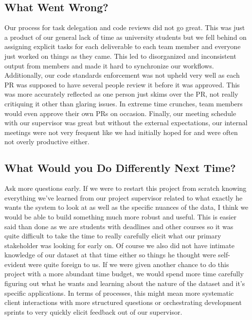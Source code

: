 \documentclass{article}
\begin{document}
\subsection{What Went Wrong?}

\par{Our process for task delegation and code reviews did not go great. This was just a product of 
our general lack of time as university students but we fell behind on assigning explicit tasks for each deliverable
to each team member and everyone just worked on things as they came. This led to disorganized and inconsistent output from members
and made it hard to synchronize our workflows. Additionally, our code standards enforcement was not upheld very well as each PR was supposed to have several
people review it before it was approved. This was more accurately reflected as one person just skims over the PR, not really critiquing it other than glaring issues. In
extreme time crunches, team members would even approve their own PRs on occasion. Finally, our meeting schedule with our supervisor was great but without the external expectations,
our internal meetings were not very frequent like we had initially hoped for and were often not overly productive either.}

\subsection{What Would you Do Differently Next Time?}

\par{Ask more questions early. If we were to restart this project from scratch knowing everything we've learned from our project supervisor
related to what exactly he wants the system to look at as well as the specific nuances of the data, I think we would be able to build something
much more robust and useful. This is easier said than done as we are students with deadlines and other courses so it was quite difficult to take
the time to really carefully elicit what our primary stakeholder was looking for early on. Of course we also did not have intimate knowledge of our 
dataset at that time either so things he thought were self-evident were quite foreign to us. If we were given another chance to do this project with
a more abundant time budget, we would spend more time carefully figuring out what he wants and learning about the nature of the dataset and it's specific applications.
In terms of processes, this might mean more systematic client interactions with more structured questions or orchestrating development sprints to very quickly
elicit feedback out of our supervisor.}
\end{document}
